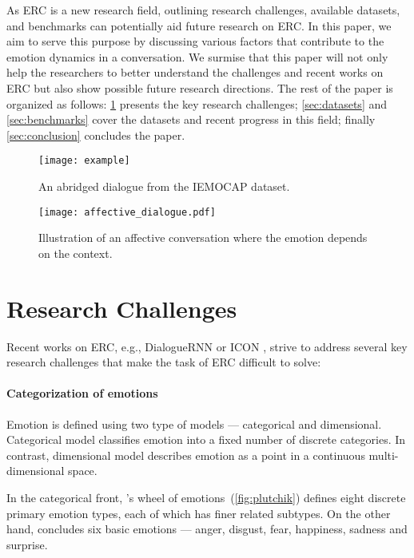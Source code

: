 \documentclass{IEEEtran}\usepackage[pdftex]{graphicx}
\begin{document}
	As ERC is a new research field, outlining research challenges, available datasets, and benchmarks can potentially aid future research on ERC. In this paper, we aim to serve this purpose by discussing various factors that contribute to the emotion dynamics in a conversation. We surmise that this paper will not only help the researchers to better understand the challenges and recent works on ERC but also show possible future research directions. The rest of the paper is organized as follows: \cref{sec:challenge} presents the key research challenges; \cref{sec:datasets} and \ref{sec:benchmarks} cover the datasets and recent progress in this field; finally \cref{sec:conclusion} concludes the paper. 
	\begin{figure}[h] 
		\centering 
		\small
		\texttt{[image: example]} 
		\caption{An abridged dialogue from the IEMOCAP dataset.}
		\label{fig:example}
	\end{figure}
	
	\begin{figure}
		\centering
		\texttt{[image: affective\_dialogue.pdf]}
		\caption{Illustration of an affective conversation where the emotion depends on the context.}
		\label{fig:affective-dialogue}
	\end{figure}
	
	\section{Research Challenges}
	\label{sec:challenge}


	Recent works on ERC, e.g., DialogueRNN \cite{majumder2019dialoguernn} or ICON \cite{hazarika2018icon}, strive to address several key research challenges that make the
	task of ERC difficult to solve:
	
	\paragraph{Categorization of emotions}


	Emotion is defined using two type of models --- categorical and
	dimensional. Categorical model classifies emotion into a fixed number of
	discrete categories. In contrast, dimensional model describes emotion as a point in
	a continuous multi-dimensional space.
	
	In the categorical front, \citet{plutchik}'s wheel of emotions~(\cref{fig:plutchik}) defines eight
	discrete primary emotion types, each of which has finer related subtypes. 
	On the other hand, \citet{ekman1993facial} concludes six basic emotions ---
	anger, disgust, fear, happiness, sadness and surprise.
	
\end{document}
